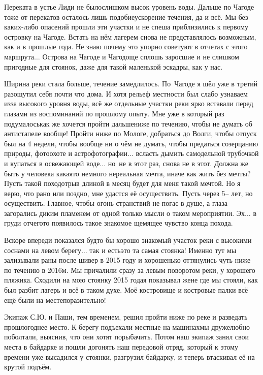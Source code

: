 Переката в устье Лиди не было\mdash слишком высок уровень воды. Дальше по Чагоде тоже от перекатов осталось лишь подобие\mdash ускорение течения, да и всё. Мы без каких-либо опасений прошли эти участки и не спеша приблизились к первому островку на Чагоде. Встать на нём лагерем снова не представлялось возможным, как и в прошлые года. Не знаю почему это упорно советуют в отчетах с этого маршрута$\ldots$ Острова на Чагоде и Чагодоще сплошь заросшие и не слишком пригодные для стоянок, даже для такой маленькой эскадры, как у нас.

Ширина реки стала больше, течение замедлилось. По~Чагоде я шёл уже в третий раз\mdash ощутил себя почти что дома. И хотя рельеф местности был слабо узнаваем из\sdash за высокого уровня воды, всё же отдельные участки реки ярко вставали перед глазами из воспоминаний по прошлому опыту. Мне уже в который раз подумалось\mdash как же хочется пройти дальше\mdash ниже по течению, чтобы не думать об антистапеле вообще! Пройти ниже по Мологе, добраться до Волги, чтобы отпуск был на 4 недели, чтобы вообще ни о чём не думать, чтобы предаться созерцанию природы, фотоохоте и астрофотографии$\ldots$ всласть дымить самодельной трубочкой и купаться в освежающей воде$\ldots$ но~не в этот раз, снова не в этот. Должна же быть у человека какая\sdash то немного нереальная мечта, иначе как жить без мечты? Пусть такой поход\sdash отрыв длиной в месяц будет для меня такой мечтой. Но я верю, что рано или поздно, мне удастся её осуществить. Пусть через 5\thinspace\nobreakdash-- лет, но осуществить. Главное, чтобы огонь странствий не погас в душе, а глаза загорались диким пламенем от одной только мысли о таком мероприятии. Эх$\ldots$ в груди отчего\sdash то появилось такое знакомое щемящее чувство конца похода. 

Вскоре впереди показался будто бы хорошо знакомый участок реки с высокими соснами на левом берегу$\ldots$ так и есть\mdash это та самая стоянка! Именно тут мы зализывали раны после шивер в 2015 году и хорошенько оттянулись чуть ниже по течению в 2016\sdash м. Мы причалили сразу за левым поворотом реки, у хорошего пляжика. Сходили на мою стоянку 2015 года\mdash я показывал жене где мы стояли, как был разбит лагерь и всё в таком духе. Моё костровище и костровые палки всё ещё были на месте\mdash поразительно! 

Экипаж С.Ю. и Паши, тем временем, решил пройти ниже по реке и разведать прошлогоднее место. К берегу подъехали местные на машинах\mdash мы дружелюбно поболтали, выяснив, что они хотят порыбачить. Потом наш экипаж занял свои места в байдарке и пошли догонять наш передовой отряд, который к этому времени уже высадился у стоянки, разгрузил байдарку, и теперь втаскивал её на крутой подъём. 

